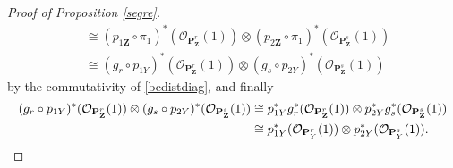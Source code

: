 \documentclass[12pt,letterpaper]{article}
\theoremstyle{definition}
\theoremstyle{remark}
\numberwithin{equation}{section}
\numberwithin{figure}{problem}
\newcommand{\OO}{\mathcal{O}}
\begin{document}
\begin{proof}[Proof of Proposition \ref{segre}]
\begin{align*}
    &\cong (p_{1\mathbf{Z}}\circ\pi_1)^*(\OO_{\mathbf{P}_\mathbf{Z}^r}(1)) \otimes (p_{2\mathbf{Z}}\circ\pi_1)^*(\OO_{\mathbf{P}_\mathbf{Z}^s}(1))\\
    &\cong (g_r \circ p_{1Y})^*(\OO_{\mathbf{P}_\mathbf{Z}^r}(1)) \otimes (g_s \circ p_{2Y})^*(\OO_{\mathbf{P}_\mathbf{Z}^s}(1))
  \end{align*}
  by the commutativity of \eqref{bcdistdiag}, and finally
  \begin{align*}
    (g_r \circ p_{1Y})^*(\OO_{\mathbf{P}_\mathbf{Z}^r}(1)) \otimes (g_s \circ p_{2Y})^*(\OO_{\mathbf{P}_\mathbf{Z}^s}(1)) &\cong p_{1Y}^*g_r^*(\OO_{\mathbf{P}_\mathbf{Z}^r}(1)) \otimes p_{2Y}^*g_s^*(\OO_{\mathbf{P}_\mathbf{Z}^s}(1))\\
    &\cong p_{1Y}^*(\OO_{\mathbf{P}_Y^r}(1)) \otimes p_{2Y}^*(\OO_{\mathbf{P}_Y^s}(1)).\qedhere
  \end{align*}
\end{proof}
\end{document}
